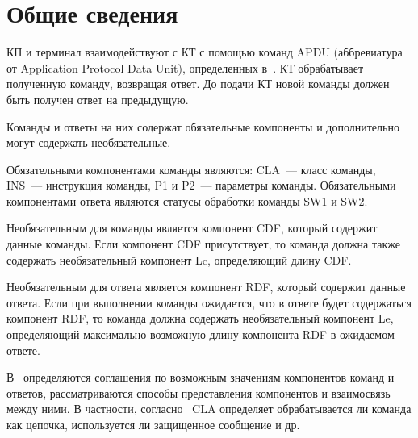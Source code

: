 \section{Общие сведения}\label{CMDS.Intro}

КП и терминал взаимодействуют с КТ с помощью команд APDU 
(аббревиатура от Application Protocol Data Unit), определенных в~\cite{APDU}. 
КТ обрабатывает полученную команду, возвращая ответ. До подачи КТ новой команды 
должен быть получен ответ на предыдущую. 

Команды и ответы на них содержат обязательные компоненты и дополнительно 
могут содержать необязательные.  

Обязательными компонентами команды являются: CLA~--- класс команды, INS~---
инструкция команды, P1 и P2~--- параметры команды. Обязательными компонентами
ответа являются статусы обработки команды SW1 и SW2.

Необязательным для команды является компонент CDF, который содержит данные 
команды. Если компонент CDF присутствует, то команда должна также содержать 
необязательный компонент Lc, определяющий длину CDF. 

Необязательным для ответа является компонент RDF, который содержит данные 
ответа. Если при выполнении команды ожидается, что в ответе будет 
содержаться компонент RDF, то команда должна содержать необязательный 
компонент Le, определяющий максимально возможную длину компонента RDF в 
ожидаемом ответе. 

В~\cite{APDU} определяются соглашения по возможным значениям компонентов команд и 
ответов, рассматриваются способы представления компонентов и взаимосвязь между ними. 
В частности, согласно~\cite{APDU} CLA определяет 
обрабатывается ли команда как цепочка,
используется ли защищенное сообщение и др.


